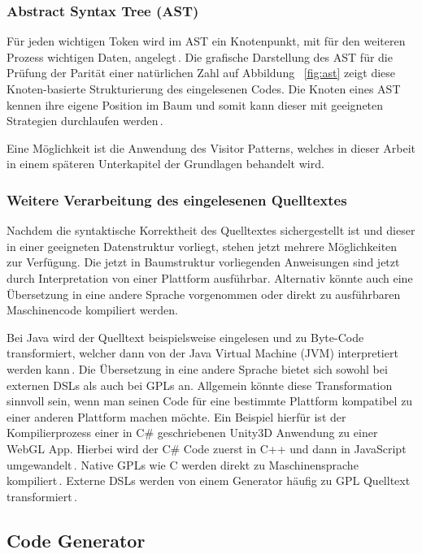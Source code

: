 \documentclass[12pt,oneside,a4paper,parskip]{scrbook}
\begin{document}
\subsubsection{Abstract Syntax Tree (AST)}

Für jeden wichtigen Token wird im AST ein Knotenpunkt, mit für den weiteren Prozess wichtigen Daten, angelegt\,\cite[S. 23]{parr2009}. Die grafische Darstellung  des AST für die Prüfung der Parität einer natürlichen Zahl auf Abbildung ~\ref{fig:ast} zeigt diese Knoten-basierte Strukturierung des eingelesenen Codes. Die Knoten eines AST kennen ihre eigene Position im Baum und somit kann dieser mit geeigneten Strategien durchlaufen werden\,\cite[S. 24]{parr2009}.

Eine Möglichkeit ist die Anwendung des Visitor Patterns, welches in dieser Arbeit in einem späteren Unterkapitel der Grundlagen behandelt wird.

\subsubsection{Weitere Verarbeitung des eingelesenen Quelltextes}

Nachdem die syntaktische Korrektheit des Quelltextes sichergestellt ist und dieser in einer geeigneten Datenstruktur vorliegt, stehen jetzt mehrere Möglichkeiten zur Verfügung. Die jetzt in Baumstruktur vorliegenden Anweisungen sind jetzt durch Interpretation von einer Plattform ausführbar. Alternativ könnte auch eine Übersetzung in eine andere Sprache vorgenommen oder direkt zu ausführbaren Maschinencode kompiliert werden.

Bei Java wird der Quelltext beispielsweise eingelesen und zu Byte-Code transformiert, welcher dann von der Java Virtual Machine (JVM) interpretiert werden kann\,\cite{javavm2014}. Die Übersetzung in eine andere Sprache bietet sich sowohl bei externen DSLs als auch bei GPLs an. Allgemein könnte diese Transformation sinnvoll sein, wenn man seinen Code für eine bestimmte Plattform kompatibel zu einer anderen Plattform machen möchte. Ein Beispiel hierfür ist der Kompilierprozess einer in C\# geschriebenen Unity3D Anwendung zu einer WebGL App. Hierbei wird der C\# Code zuerst in C++ und dann in JavaScript umgewandelt\,\cite{unity2018}. Native GPLs wie C werden direkt zu Maschinensprache kompiliert\,\cite{kernighan1988}. Externe DSLs werden von einem Generator häufig zu GPL Quelltext transformiert\,\cite[S. 26]{voelter2013}.

\subsection{Code Generator}
\end{document}

